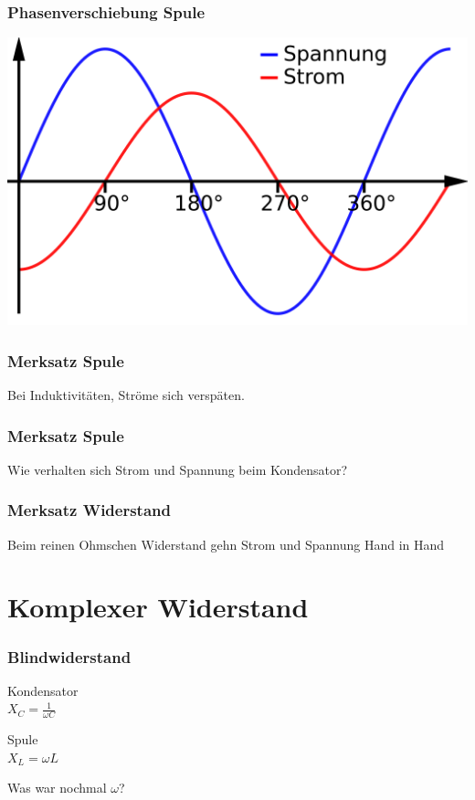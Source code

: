 \begin{frame}
    \frametitle{Phasenverschiebung Spule}
	\begin{center}
        \includegraphics[width=1\textwidth]{a03/Phasenverschiebung_induktiv.png}
        \tiny \hyperlink{refs}{\cite{wc}}
    \end{center}
\end{frame}

\begin{frame}
\frametitle{Merksatz Spule}
\begin{center}
		\huge{Bei Induktivitäten, Ströme sich verspäten.}
\end{center}
\end{frame}

\begin{frame}
\frametitle{Merksatz Spule}
\begin{center}
		\huge{Wie verhalten sich Strom und Spannung beim Kondensator?}
\end{center}
\end{frame}

\begin{frame}
\frametitle{Merksatz Widerstand}
\begin{center}
		\huge{Beim reinen Ohmschen Widerstand gehn Strom und Spannung Hand in Hand}
\end{center}
\end{frame}

\section*{Komplexer Widerstand}

\begin{frame}
	\frametitle{Blindwiderstand}
\begin{minipage}{0.49\textwidth}
	\huge{Kondensator}\\
	\huge{$X_{C} = \frac{1}{\omega C}$}
\end{minipage}
\begin{minipage}{0.49\textwidth}
	\huge{Spule}\\
	\huge{$X_{L} = \omega L$}
\end{minipage}
\begin{center}
	\vspace{1cm}
Was war nochmal $\omega$? \\
\end{center}
\end{frame}

